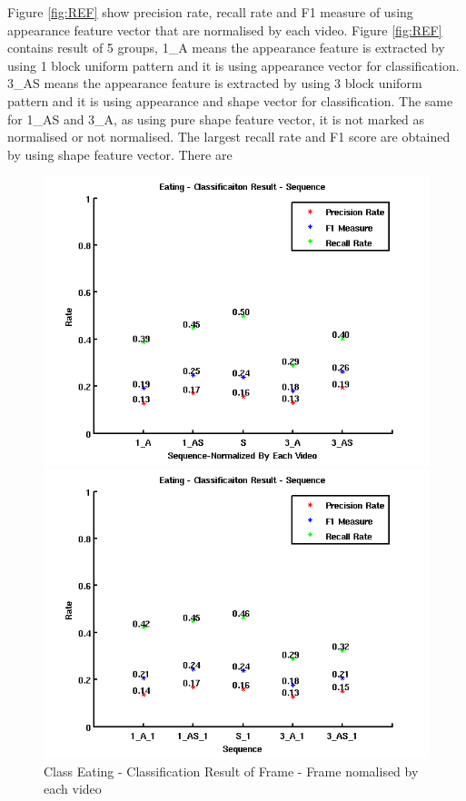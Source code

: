 Figure \ref{fig:REF} show precision rate, recall rate and F1 measure of using appearance feature vector that are normalised by each video. Figure \ref{fig:REF} contains result of 5 groups, 1\_A means the appearance feature is extracted by using 1 block uniform pattern and it is using appearance vector for classification. 3\_AS means the appearance feature is extracted by using 3 block uniform pattern and it is using appearance and shape vector for classification. The same for 1\_AS and 3\_A, as using pure shape feature vector, it is not marked as normalised or not normalised. The  largest recall rate and F1 score are obtained by using shape feature vector. There are 
\begin{figure}[ht]
\centering
\begin{minipage}{.5\textwidth}
  \centering
  \captionsetup{justification=centering,margin=1cm}
  \includegraphics[width=\linewidth]{imgs/Result_Eating_Sequence.png}
  \caption{Class Eating - Classification Result of Frame - Frame nomalised by each video}
  \label{fig:RES}
\end{minipage}%
\begin{minipage}{.5\textwidth}
  \centering
  \captionsetup{justification=centering,margin=1cm}
  \includegraphics[width=\linewidth]{imgs/Result_Eating_Sequence_1.png}

\end{minipage}
\end{figure}
